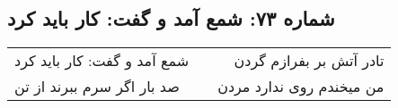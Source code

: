 \begin{center}
\section*{شماره ۷۳: شمع آمد و گفت: کار باید کرد}
\label{sec:073}
\begin{longtable}{l p{0.5cm} r}
شمع آمد و گفت: کار باید کرد
&&
تادر آتش بر بفرازم گردن
\\
صد بار اگر سرم ببرند از تن
&&
من میخندم روی ندارد مردن
\\
\end{longtable}
\end{center}
